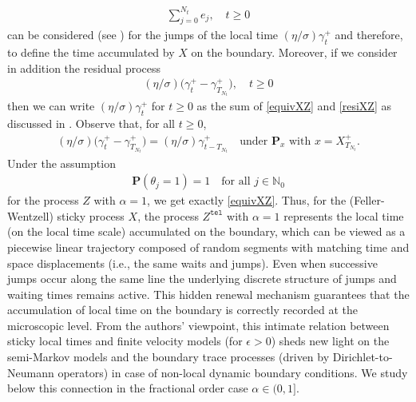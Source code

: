 \documentclass[10pt,a4paper]{article}
\numberwithin{equation}{section}
\theoremstyle{plain}
\theoremstyle{remark}
\begin{document}
\begin{align}
\sum_{j=0}^{N_t} e_j, \quad t\geq 0
\label{equivXZ}
\end{align}
can be considered (see \cite[formula (6.10)]{EJP}) for the jumps of the local time $(\eta/\sigma) \gamma^+_t$ and therefore, to define the time accumulated by $X$ on the boundary. Moreover, if we consider in addition the residual process
\begin{align}
(\eta/\sigma) \big( \gamma^+_t - \gamma^+_{T_{N_t}} \big), \quad t\geq 0
\label{resiXZ}
\end{align}
then we can write $(\eta/\sigma)\gamma^+_t$ for $t\geq 0$ as the sum of \eqref{equivXZ} and \eqref{resiXZ} as discussed in \cite[formula (6.10)]{EJP}. Observe that, for all $t\geq 0$,
\begin{align*}
(\eta/\sigma) \big( \gamma^+_t - \gamma^+_{T_{N_t}} \big) = (\eta/\sigma) \gamma^+_{t -T_{N_t}} \quad \textrm{under $\mathbf{P}_x$ with $x=X^+_{T_{N_t}}$.}
\end{align*}
Under the assumption
\begin{align*}
\mathbf{P}(\theta_j = 1) = 1 \quad \textrm{for all $j \in \mathbb{N}_0$}
\end{align*}
for the process $Z$ with $\alpha=1$, we get exactly \eqref{equivXZ}. Thus, for  
the (Feller-Wentzell) sticky process $X$, the process $Z^\mathtt{tel}$ with $\alpha=1$ represents the local time (on the local time scale) accumulated on the boundary, which can be viewed as a piecewise linear trajectory composed of random segments with matching time and space displacements (i.e., the same waits and jumps). Even when successive jumps occur along the same line the underlying discrete structure of jumps and waiting times remains active. This hidden renewal mechanism guarantees that the accumulation of local time on the boundary is correctly recorded at the microscopic level. From the authors' viewpoint, this intimate relation between sticky local times and finite velocity models (for $\epsilon>0$) sheds new light on the semi-Markov models and the boundary trace processes (driven by Dirichlet-to-Neumann operators) in case of non-local dynamic boundary conditions. We study below this connection in the fractional order case  $\alpha \in (0,1]$.\\
\end{document}
